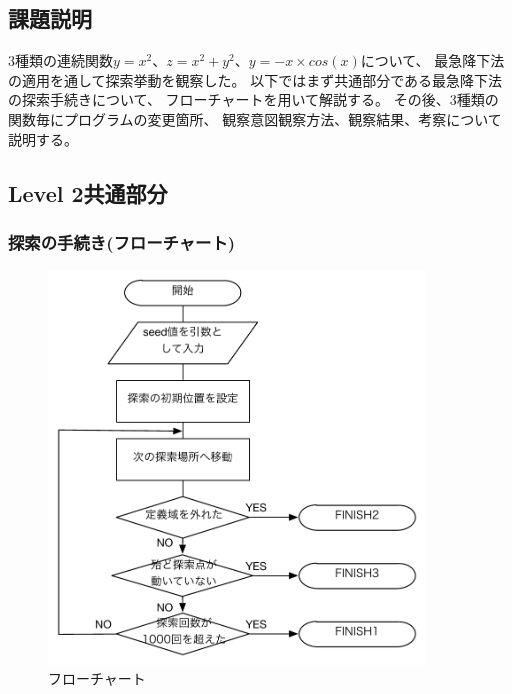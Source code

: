 \subsection{課題説明}
3種類の連続関数$y=x^2$、$z=x^2+y^2$、$y=-x \times cos(x)$について、
最急降下法の適用を通して探索挙動を観察した。
以下ではまず共通部分である最急降下法の探索手続きについて、
フローチャートを用いて解説する。
その後、3種類の関数毎にプログラムの変更箇所、
観察意図観察方法、観察結果、考察について説明する。


\subsection{Level 2共通部分}

\subsubsection{探索の手続き(フローチャート)}


\begin{figure}[h]
 \begin{center}
  \includegraphics[width=10.0cm]{figs/level2.0/flow.pdf}
  \caption{フローチャート}
	\label{trans_seed}
 \end{center}
\end{figure}



